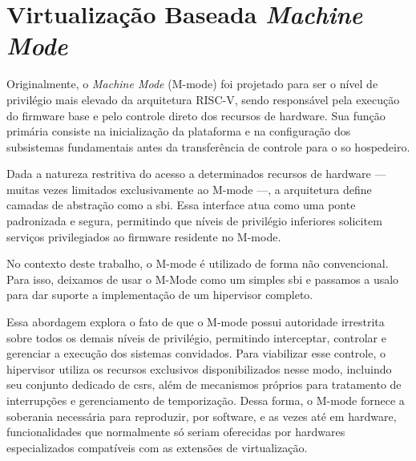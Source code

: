 \section{Virtualização Baseada \textit{Machine Mode}}

Originalmente, o \textit{Machine Mode} (M-mode) foi projetado para ser  o nível de privilégio mais elevado da arquitetura RISC-V, sendo
responsável pela execução do firmware base e pelo controle direto dos recursos de hardware.
Sua função primária consiste na inicialização da plataforma e na configuração dos subsistemas fundamentais antes da
transferência de controle para o \gls{so} hospedeiro.

Dada a natureza restritiva do acesso a determinados recursos de hardware — muitas vezes limitados exclusivamente ao M-mode —, a
arquitetura define camadas de abstração como a \gls{sbi}. Essa interface atua como uma ponte padronizada e segura, permitindo que
níveis de privilégio inferiores solicitem serviços privilegiados ao firmware residente no M-mode.

No contexto deste trabalho, o M-mode é utilizado de forma não convencional. Para isso, deixamos de usar o M-Mode como um simples
\gls{sbi} e passamos a usalo para dar suporte a implementação de um hipervisor completo.

Essa abordagem explora o fato de que o M-mode possui autoridade irrestrita sobre todos os demais níveis de privilégio, permitindo
interceptar, controlar e gerenciar a execução dos sistemas convidados. Para viabilizar esse controle, o hipervisor utiliza
os recursos exclusivos disponibilizados nesse modo, incluindo seu conjunto dedicado de \glspl{csr}, além de mecanismos próprios
para tratamento de interrupções e gerenciamento de temporização. Dessa forma, o M-mode fornece a soberania necessária
para reproduzir, por software, e as vezes até em hardware, funcionalidades que normalmente só seriam oferecidas por
hardwares especializados compatíveis com as extensões de virtualização.
